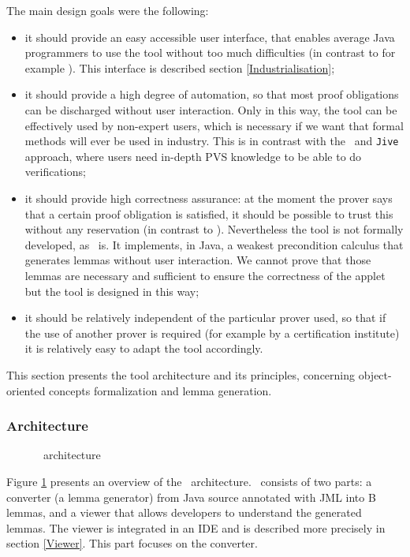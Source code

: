  The main design goals were the following:
 \begin{itemize}
 \item it should provide an easy accessible user interface, that enables average Java programmers to use the tool
 without too much difficulties (in contrast to for example \LOOP). This interface is
described section \ref{Industrialisation};
 \item it should provide a high degree of automation, so that most proof obligations can be discharged without user
 interaction. Only in this way, the tool can be effectively used by non-expert users, which is necessary if we want that
 formal methods will ever be used in industry. This is in
contrast with the \LOOP\ and \texttt{Jive} approach, where users need in-depth PVS knowledge to be able to do
verifications;
 \item it should provide high correctness assurance: at the moment the prover says that a certain proof obligation
is satisfied, it should be possible to trust this without any reservation (in contrast to \ESC). Nevertheless
the tool is not formally developed, as \LOOP\ is. It implements, in Java, a weakest precondition calculus that
generates lemmas without user interaction. We cannot prove that those lemmas are necessary and sufficient to
ensure the correctness of the applet but the tool is designed in this way;
 \item it should be relatively independent of the particular prover used, so that if the use of another prover is
 required (for example by a certification institute) it is relatively easy to adapt the tool accordingly.
\end{itemize}

 This section presents the tool architecture and its principles,
 concerning object-oriented concepts formalization and lemma generation.
\subsubsection{Architecture}
\begin{figure}[thp]
 \caption{\JACK\ architecture}
 \label{JACKarchitecture}
\end{figure}
 Figure \ref{JACKarchitecture} presents an overview of the \JACK\
 architecture.  \JACK\ consists of two parts: a converter (a lemma generator) from
 Java source annotated with JML into B lemmas, and a viewer that
 allows developers to understand the generated
 lemmas.  The viewer is integrated in an IDE and is described more precisely in section
 \ref{Viewer}.  This part focuses on the converter.

